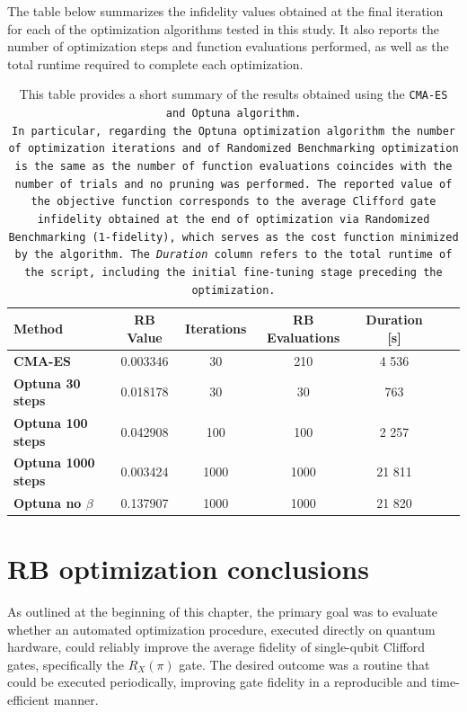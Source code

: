 The table below summarizes the infidelity values obtained at the final iteration for each of the optimization algorithms tested in this study. 
It also reports the number of optimization steps and function evaluations performed, as well as the total runtime required to complete each optimization.

\begin{table}[h]
    \centering
    \begin{tabular}{lcccccc}
        \toprule
        \textbf{Method} & \textbf{RB Value} & \textbf{Iterations} & \textbf{RB Evaluations} & \textbf{Duration [s]}\\
        \midrule
        \textbf{CMA-ES} & 0.003346 & 30 & 210 & 4 536 \\
        \textbf{Optuna 30 steps} & 0.018178  & 30 & 30 & 763\\
        \textbf{Optuna 100 steps} & 0.042908 & 100 & 100 & 2 257\\
        \textbf{Optuna 1000 steps} & 0.003424 & 1000 & 1000 & 21 811\\
        \textbf{Optuna no $\beta$} & 0.137907 & 1000 & 1000 & 21 820\\
        \bottomrule
    \end{tabular}
    \caption{This table provides a short summary of the results obtained using the \tt{CMA-ES} and \tt{Optuna} algorithm.\\ 
    In particular, regarding the \tt{Optuna} optimization algorithm the number of optimization iterations and of Randomized Benchmarking optimization is the same as the number of function evaluations coincides with the number of trials and no pruning was performed.
    The reported value of the objective function corresponds to the average Clifford gate infidelity obtained at the end of optimization via Randomized Benchmarking (1-fidelity), which serves as the cost function minimized by the algorithm.
    The \textit{Duration} column refers to the total runtime of the script, including the initial fine-tuning stage preceding the optimization.\\}
    \label{tab:optuna_opt}
\end{table}

\section{RB optimization conclusions}

As outlined at the beginning of this chapter, the primary goal was to evaluate whether an automated optimization procedure, executed directly on quantum hardware, could reliably improve the average fidelity of single-qubit Clifford gates, specifically the $R_X(\pi)$ gate. 
The desired outcome was a routine that could be executed periodically, improving gate fidelity in a reproducible and time-efficient manner.

